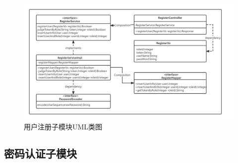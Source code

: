 \begin{figure}[htb]
    \centering
    \includegraphics[width=1\textwidth]{my_figures/chapter5/用户注册子模块UML类图.png}
    \caption{用户注册子模块UML类图}
    \label{fig:用户注册子模块UML类图}
\end{figure}

\subsection{密码认证子模块}



